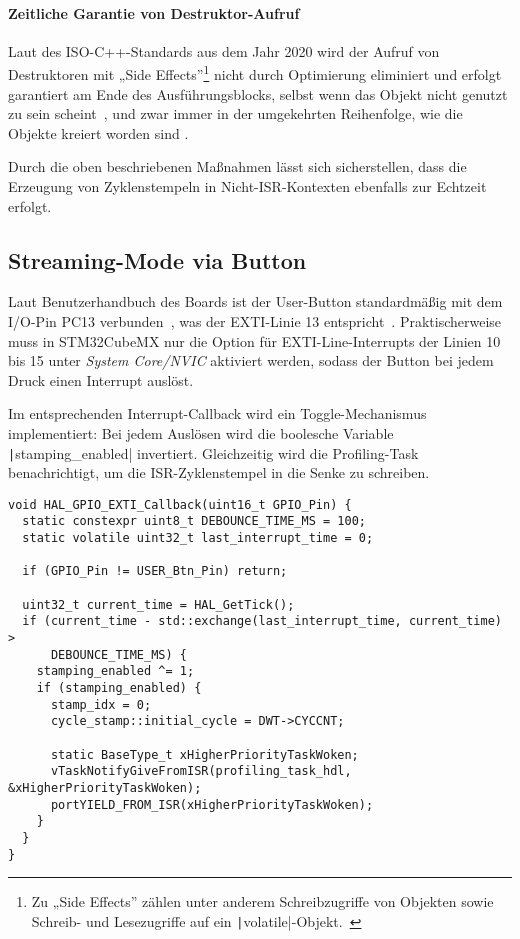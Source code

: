 \paragraph{Zeitliche Garantie von Destruktor-Aufruf}

Laut des ISO-C++-Standards aus dem Jahr 2020 wird der Aufruf von Destruktoren
mit „Side Effects”\footnote{Zu „Side Effects” zählen unter anderem
Schreibzugriffe von Objekten sowie Schreib- und Lesezugriffe auf ein
\texttt|volatile|-Objekt.~\cite{cppreference_eval_order}} nicht durch
Optimierung eliminiert und erfolgt garantiert am Ende des Ausführungsblocks,
selbst wenn das Objekt nicht genutzt zu sein scheint~\cite[§6.7.5.4 Abs.
3]{iso_iec_14882_2020}, und zwar immer in der umgekehrten Reihenfolge, wie die
Objekte kreiert worden sind \cite{isocpp_dtor_order}.

Durch die oben beschriebenen Maßnahmen lässt sich sicherstellen, dass die
Erzeugung von Zyklenstempeln in Nicht-ISR-Kontexten ebenfalls zur Echtzeit
erfolgt.

\subsection{Streaming-Mode via Button}

Laut Benutzerhandbuch des Boards ist der User-Button standardmäßig mit dem
I/O-Pin PC13 verbunden~\cite[S. 24, 6.6]{stm32_nucleo144_user_manual}, was der
EXTI-Linie 13 entspricht~\cite[S. 322, 11.8]{stm32f7_ref_manual}.
Praktischerweise muss in STM32CubeMX nur die Option für EXTI-Line-Interrupts der
Linien 10 bis 15 unter \textit{System Core/NVIC} aktiviert werden, sodass der
Button bei jedem Druck einen Interrupt auslöst.

Im entsprechenden Interrupt-Callback wird ein Toggle-Mechanismus implementiert:
Bei jedem Auslösen wird die boolesche Variable
\texttt|stamping_enabled| invertiert. Gleichzeitig wird die
Profiling-Task benachrichtigt, um die ISR-Zyklenstempel in die Senke zu
schreiben.

\begin{code}
\begin{verbatim}
void HAL_GPIO_EXTI_Callback(uint16_t GPIO_Pin) {
  static constexpr uint8_t DEBOUNCE_TIME_MS = 100;
  static volatile uint32_t last_interrupt_time = 0;

  if (GPIO_Pin != USER_Btn_Pin) return;

  uint32_t current_time = HAL_GetTick();
  if (current_time - std::exchange(last_interrupt_time, current_time) >
      DEBOUNCE_TIME_MS) {
    stamping_enabled ^= 1;
    if (stamping_enabled) {
      stamp_idx = 0;
      cycle_stamp::initial_cycle = DWT->CYCCNT;

      static BaseType_t xHigherPriorityTaskWoken;
      vTaskNotifyGiveFromISR(profiling_task_hdl, &xHigherPriorityTaskWoken);
      portYIELD_FROM_ISR(xHigherPriorityTaskWoken);
    }
  }
}
\end{verbatim}
\end{code}

